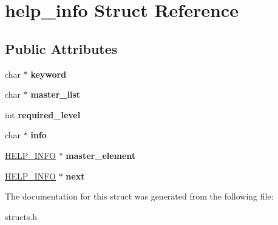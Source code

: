 \hypertarget{structhelp__info}{\section{help\-\_\-info Struct Reference}
\label{structhelp__info}
}
\subsection*{Public Attributes}
\begin{DoxyCompactItemize}
\item 
\hypertarget{structhelp__info_aac7c41b14f94f94c61268c91cbcad522}{char $\ast$ {\bfseries keyword}}\label{structhelp__info_aac7c41b14f94f94c61268c91cbcad522}

\item 
\hypertarget{structhelp__info_af15d68887c64a3989b2a97c39e592099}{char $\ast$ {\bfseries master\-\_\-list}}\label{structhelp__info_af15d68887c64a3989b2a97c39e592099}

\item 
\hypertarget{structhelp__info_aec847b875c832132afb0e132e0126a6b}{int {\bfseries required\-\_\-level}}\label{structhelp__info_aec847b875c832132afb0e132e0126a6b}

\item 
\hypertarget{structhelp__info_a7e6e76d90ae4aeb1db48cee1eeee33d8}{char $\ast$ {\bfseries info}}\label{structhelp__info_a7e6e76d90ae4aeb1db48cee1eeee33d8}

\item 
\hypertarget{structhelp__info_af7c2d49f46dddf86d147fb73571e143f}{\hyperlink{structhelp__info}{H\-E\-L\-P\-\_\-\-I\-N\-F\-O} $\ast$ {\bfseries master\-\_\-element}}\label{structhelp__info_af7c2d49f46dddf86d147fb73571e143f}

\item 
\hypertarget{structhelp__info_a9151e388d483f9dfa356c5e3f9f9a714}{\hyperlink{structhelp__info}{H\-E\-L\-P\-\_\-\-I\-N\-F\-O} $\ast$ {\bfseries next}}\label{structhelp__info_a9151e388d483f9dfa356c5e3f9f9a714}

\end{DoxyCompactItemize}


The documentation for this struct was generated from the following file\-:\begin{DoxyCompactItemize}
\item 
structs.\-h\end{DoxyCompactItemize}
